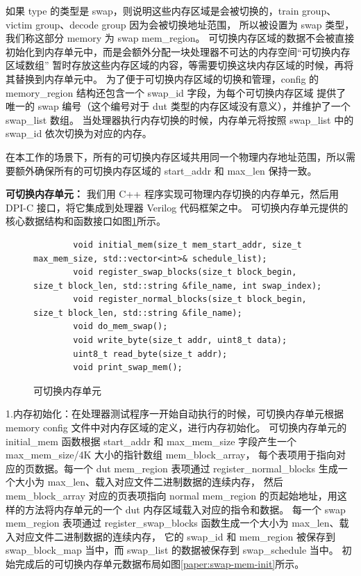 如果 type 的类型是 swap，则说明这些内存区域是会被切换的，train group、victim group、decode group 因为会被切换地址范围，
所以被设置为 swap 类型，我们称这部分 memory 为 swap mem\_region。
可切换内存区域的数据不会被直接初始化到内存单元中，而是会额外分配一块处理器不可达的内存空间“可切换内存区域数组”
暂时存放这些内存区域的内容，等需要切换这块内存区域的时候，再将其替换到内存单元中。
为了便于可切换内存区域的切换和管理，config 的 memory\_region 结构还包含一个 swap\_id 字段，为每个可切换内存区域
提供了唯一的 swap 编号（这个编号对于 dut 类型的内存区域没有意义），并维护了一个 swap\_list 数组。
当处理器执行内存切换的时候，内存单元将按照 swap\_list 中的 swap\_id 依次切换为对应的内存。\par 

在本工作的场景下，所有的可切换内存区域共用同一个物理内存地址范围，所以需要额外确保所有的可切换内存区域的 start\_addr
和 max\_len 保持一致。\par

\textbf{可切换内存单元：}
我们用 C++ 程序实现可物理内存切换的内存单元，然后用 DPI-C 接口，将它集成到处理器 Verilog 代码框架之中。
可切换内存单元提供的核心数据结构和函数接口如图\ref{code:swappable-memory}所示。\par

\begin{figure}[htbp]
    \centering
    \begin{verbatim}
        void initial_mem(size_t mem_start_addr, size_t max_mem_size, std::vector<int>& schedule_list);
        void register_swap_blocks(size_t block_begin, size_t block_len, std::string &file_name, int swap_index);
        void register_normal_blocks(size_t block_begin, size_t block_len, std::string &file_name);
        void do_mem_swap();
        void write_byte(size_t addr, uint8_t data);
        uint8_t read_byte(size_t addr);
        void print_swap_mem();
    \end{verbatim}
    \caption{可切换内存单元}
    \label{code:swappable-memory}
\end{figure}

1.内存初始化：在处理器测试程序一开始自动执行的时候，可切换内存单元根据 memory config 文件中对内存区域的定义，进行内存初始化。
可切换内存单元的 initial\_mem 函数根据 start\_addr 和 max\_mem\_size 字段产生一个 max\_mem\_size/4K 大小的指针数组 mem\_block\_array，
每个表项用于指向对应的页数据。每一个 dut mem\_region 表项通过 register\_normal\_blocks 生成一个大小为 max\_len、载入对应文件二进制数据的连续内存，
然后 mem\_block\_array 对应的页表项指向 normal mem\_region 的页起始地址，用这样的方法将内存单元的一个 dut 内存区域载入对应的指令和数据。
每一个 swap mem\_region 表项通过 register\_swap\_blocks 函数生成一个大小为 max\_len、载入对应文件二进制数据的连续内存，
它的 swap\_id 和 mem\_region 被保存到 swap\_block\_map 当中，而 swap\_list 的数据被保存到 swap\_schedule 当中。
初始完成后的可切换内存单元数据布局如图\ref{paper:swap-mem-init}所示。\par

